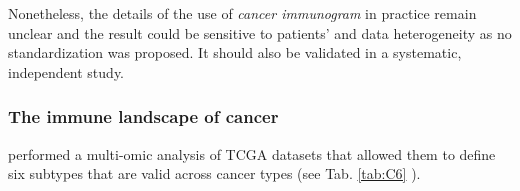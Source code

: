 \documentclass[12pt,]{book}
\theoremstyle{definition}
\theoremstyle{definition}
\theoremstyle{definition}
\theoremstyle{remark}
\begin{document}
Nonetheless, the details of the use of \emph{cancer immunogram} in
practice remain unclear and the result could be sensitive to patients'
and data heterogeneity as no standardization was proposed. It should
also be validated in a systematic, independent study.

\hypertarget{the-immune-landscape-of-cancer}{%
\subsubsection{The immune landscape of
cancer}\label{the-immune-landscape-of-cancer}}

\begin{table}

\caption[Six immunological subtypes of cancer]{\label{tab:C6}\textbf{Six immunological subtypes of cancer}. The
general characteristic of subtypes generated by \citet{Thorsson2018} as
described in the original publication.}
\centering
{}
\end{table}

\citet{Thorsson2018} performed a multi-omic analysis of TCGA datasets
that allowed them to define six subtypes that are valid across cancer
types (see Tab. \ref{tab:C6} ).
\end{document}
